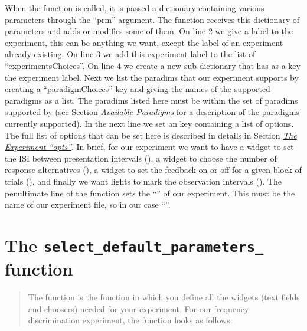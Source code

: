 \documentclass[a4paper,12pt,english]{sphinxmanual}
\begin{document}
When the function is called, it is passed a dictionary containing
various parameters through the “prm” argument. The function receives
this dictionary of parameters and adds or modifies some of them. On line 2
we give a label to the experiment, this can be anything we
want, except the label of an experiment already existing. On line 3
we add this experiment label to the list of “experimentsChoices”.
On line 4 we create a new sub-dictionary that has as a key the
experiment label. Next we list the paradims that our experiment
supports by creating a “paradigmChoices” key and giving the names of
the supported paradigms as a list. The paradims listed here must be
within the set of paradims  supported by  (see
Section {\hyperref[psychophysics:sec-paradigms]{\emph{Available Paradigms}}} for a description of the paradigms currently
supported). In the next line we set an  key containing a list
of options. The full list of options that can be set here is described
in details in Section {\hyperref[custom_experiments:sec-experiment-opts]{\emph{The Experiment “opts”}}}. In brief, for our
experiment we want to have a widget to set the ISI between presentation
intervals (), a widget to choose the number of response
alternatives (), a widget to set the feedback
on or off for a given block of trials (), and finally we
want lights to mark the observation intervals ().
The penultimate line of the  function sets the
“” of our experiment. This must be the name of our
experiment file, so in our case “”.


\section{The \texttt{select\_default\_parameters\_} function}
\label{custom_experiments:the-select-default-parameters-function}\begin{quote}

The  function is the function in which you define all the widgets (text fields and choosers) needed for your experiment. For our frequency discrimination experiment, the function looks as follows:
\end{quote}
\end{document}
